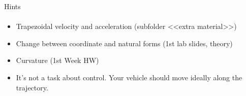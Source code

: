 \documentclass[aspectratio=169]{beamer}
\newcommand{\fbckg}[1]{\usebackgroundtemplate{\texttt{[image: \#1]}}}%
\begin{document}
\begin{frame}[t]{Hints}
\framesubtitle{}
  \begin{itemize}
    \item Trapezoidal velocity and acceleration (subfolder <<extra material>>)
    \item Change between coordinate and natural forms (1st lab slides, theory)
    \item Curvature (1st Week HW)
    \item It's not a task about control. Your vehicle should move ideally along the trajectory.
  \end{itemize}
\end{frame}

\fbckg{fibeamer/figs/last_page.png}
\frame[plain]{}
\end{document}
